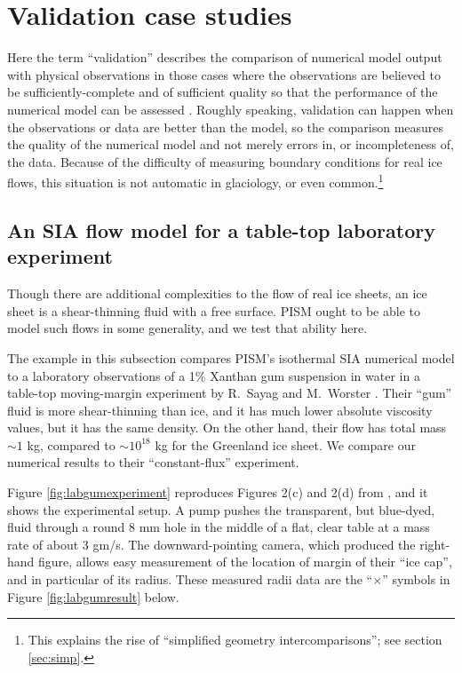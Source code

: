 
\section{Validation case studies}\label{sec:validation} 

Here the term ``validation'' describes the comparison of numerical model output with physical observations in those cases where the observations are believed to be sufficiently-complete and of sufficient quality so that the performance of the numerical model can be assessed \cite{Roache,Wesseling}.  Roughly speaking, validation can happen when the observations or data are better than the model, so the comparison measures the quality of the numerical model and not merely errors in, or incompleteness of, the data.  Because of the difficulty of measuring boundary conditions for real ice flows, this situation is not automatic in glaciology, or even common.\footnote{This explains the rise of ``simplified geometry intercomparisons''; see section \ref{sec:simp}.}

\subsection{An SIA flow model for a table-top laboratory experiment}\label{sec:labgum}
 

Though there are additional complexities to the flow of real ice sheets, an ice sheet is a shear-thinning fluid with a free surface.  PISM ought to be able to model such flows in some generality, and we test that ability here.

The example in this subsection compares PISM's isothermal SIA numerical model to a laboratory observations of a 1\% Xanthan gum suspension in water in a table-top moving-margin experiment by R.~Sayag and M.~Worster \cite{SayagWorster2013,SayagPeglerWorster2012}.  Their ``gum'' fluid is more shear-thinning than ice, and it has much lower absolute viscosity values, but it has the same density.  On the other hand, their flow has total mass $\sim 1$ kg, compared to $\sim 10^{18}$ kg for the Greenland ice sheet.  We compare our numerical results to their ``constant-flux'' experiment.

Figure \ref{fig:labgumexperiment} reproduces Figures 2(c) and 2(d) from \cite{SayagWorster2013}, and it shows the experimental setup.  A pump pushes the transparent, but blue-dyed, fluid through a round 8 mm hole in the middle of a flat, clear table at a mass rate of about 3 gm/s.  The downward-pointing camera, which produced the right-hand figure, allows easy measurement of the location of margin of their ``ice cap'', and in particular of its radius.  These measured radii data are the ``$\times$'' symbols in Figure \ref{fig:labgumresult} below.

